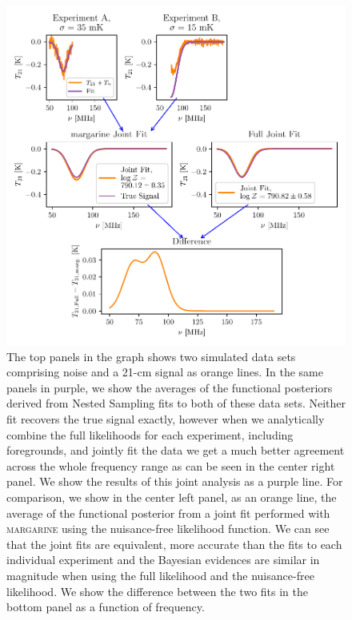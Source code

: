 \begin{figure}
    \centering
    \includegraphics{margarine/figs/margarine_combined_signal.pdf}
    \caption{The top panels in the graph shows two simulated data sets comprising noise and a 21-cm signal as orange lines. In the same panels in purple, we show the averages of the functional posteriors derived from Nested Sampling fits to both of these data sets. Neither fit recovers the true signal exactly, however when we analytically combine the full likelihoods for each experiment, including foregrounds, and jointly fit the data we get a much better agreement across the whole frequency range as can be seen in the center right panel. We show the results of this joint analysis as a purple line. For comparison, we show in the center left panel, as an orange line, the average of the functional posterior from a joint fit performed with \textsc{margarine} using the nuisance-free likelihood function. We can see that the joint fits are equivalent, more accurate than the fits to each individual experiment and the Bayesian evidences are similar in magnitude when using the full likelihood and the nuisance-free likelihood. We show the difference between the two fits in the bottom panel as a function of frequency.}
    \label{fig:joint_likelihood}
\end{figure}


